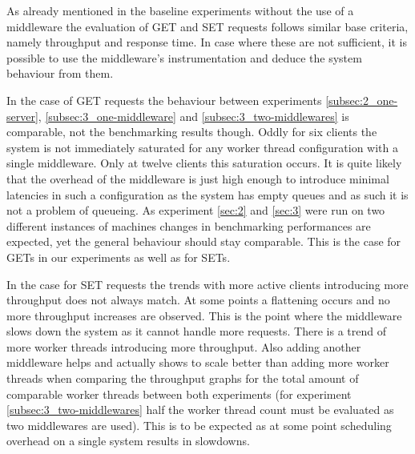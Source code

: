         As already mentioned in the baseline experiments without the use of a middleware the evaluation of GET and SET
        requests follows similar base criteria, namely throughput and response time. In case where these are not
        sufficient, it is possible to use the middleware's instrumentation and deduce the system behaviour from them.

        In the case of GET requests the behaviour between experiments \ref{subsec:2_one-server},
        \ref{subsec:3_one-middleware} and \ref{subsec:3_two-middlewares} is comparable, not the benchmarking results
        though. Oddly for six clients the system is not immediately saturated for any worker thread configuration with a
        single middleware. Only at twelve clients this saturation occurs. It is quite likely that the overhead of the
        middleware is just high enough to introduce minimal latencies in such a configuration as the system has empty
        queues and as such it is not a problem of queueing. As experiment \ref{sec:2} and \ref{sec:3} were run on two
        different instances of machines changes in benchmarking performances are expected, yet the general behaviour
        should stay comparable. This is the case for GETs in our experiments as well as for SETs.

        In the case for SET requests the trends with more active clients introducing more throughput does not always
        match. At some points a flattening occurs and no more throughput increases are observed. This is the point
        where the middleware slows down the system as it cannot handle more requests. There is a trend of more worker
        threads introducing more throughput. Also adding another middleware helps and actually shows to scale better
        than adding more worker threads when comparing the throughput graphs for the total amount of comparable worker
        threads between both experiments (for experiment \ref{subsec:3_two-middlewares} half the worker thread count
        must be evaluated as two middlewares are used). This is to be expected as at some point scheduling overhead on a
        single system results in slowdowns.

